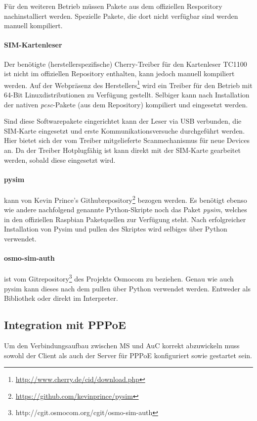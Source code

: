             Für den weiteren Betrieb müssen Pakete aus dem offiziellen Resporitory
            nachinstalliert werden. Spezielle Pakete, die dort nicht verfügbar sind werden
            manuell kompiliert.

            \paragraph{SIM-Kartenleser} Der benötigte (herstellerspezifische)
            Cherry-Treiber für den Kartenleser TC1100 ist nicht im offiziellen Repository enthalten, kann jedoch
            manuell kompiliert werden. Auf der Webpräsenz des Herstellers\footnote{\url{http://www.cherry.de/cid/download.php}}
            wird ein Treiber für den Betrieb mit 64-Bit Linuxdistributionen zu Verfügung gestellt.
            Selbiger kann nach Installation der nativen \textit{pcsc}-Pakete (aus dem Repository)
            kompiliert und eingesetzt werden.

            Sind diese Softwarepakete eingerichtet kann der Leser via USB verbunden, die SIM-Karte eingesetzt
            und erste Kommunikationsversuche durchgeführt werden. Hier bietet sich der vom
            Treiber mitgelieferte Scanmechanismus für neue Devices an. Da der Treiber
            Hotplugfähig ist kann direkt mit der SIM-Karte gearbeitet werden, sobald diese
            eingesetzt wird.

			\paragraph{pysim} kann von Kevin Prince's Githubrepository\footnote{\url{https://github.com/kevinprince/pysim}} bezogen werden. Es benötigt ebenso
            wie andere nachfolgend genannte Python-Skripte noch das Paket \textit{pysim}, welches
            in den offiziellen Raspbian Paketquellen zur Verfügung steht. Nach erfolgreicher Installation
            von Pysim und pullen des Skriptes wird selbiges über Python verwendet.

            \paragraph{osmo-sim-auth} ist vom Gitrepository\footnote{\url{}http://cgit.osmocom.org/cgit/osmo-sim-auth} des Projekts Osmocom zu  beziehen. Genau wie auch pysim kann dieses nach dem pullen
            über Python verwendet werden. Entweder als Bibliothek oder direkt im Interpreter.

	\subsection{Integration mit PPPoE}
        Um den Verbindungsaufbau zwischen \ac{MS} und \ac{AuC} korrekt abzuwickeln muss sowohl der Client
        als auch der Server für \ac{PPPoE} konfiguriert sowie gestartet sein.

